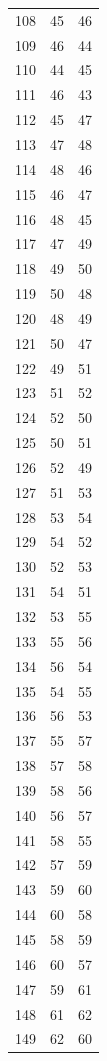\documentclass[a4paper,11pt]{article}
\begin{document}
\begin{center}
\begin{longtable}{|R{1.5cm}|R{1.5cm}|R{1.5cm}|}
  108 &   45 &   46 \\
  109 &   46 &   44 \\
  110 &   44 &   45 \\
  111 &   46 &   43 \\
  112 &   45 &   47 \\
  113 &   47 &   48 \\
  114 &   48 &   46 \\
  115 &   46 &   47 \\
  116 &   48 &   45 \\
  117 &   47 &   49 \\
  118 &   49 &   50 \\
  119 &   50 &   48 \\
  120 &   48 &   49 \\
  121 &   50 &   47 \\
  122 &   49 &   51 \\
  123 &   51 &   52 \\
  124 &   52 &   50 \\
  125 &   50 &   51 \\
  126 &   52 &   49 \\
  127 &   51 &   53 \\
  128 &   53 &   54 \\
  129 &   54 &   52 \\
  130 &   52 &   53 \\
  131 &   54 &   51 \\
  132 &   53 &   55 \\
  133 &   55 &   56 \\
  134 &   56 &   54 \\
  135 &   54 &   55 \\
  136 &   56 &   53 \\
  137 &   55 &   57 \\
  138 &   57 &   58 \\
  139 &   58 &   56 \\
  140 &   56 &   57 \\
  141 &   58 &   55 \\
  142 &   57 &   59 \\
  143 &   59 &   60 \\
  144 &   60 &   58 \\
  145 &   58 &   59 \\
  146 &   60 &   57 \\
  147 &   59 &   61 \\
  148 &   61 &   62 \\
  149 &   62 &   60 \\

\end{longtable}
\end{center}
\end{document}
